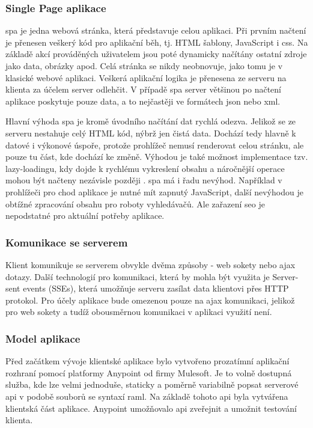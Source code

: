 \documentclass[a4paper,11pt,titlepage,fleqn]{article}
\begin{document}
        \subsubsection{Single Page aplikace}
            \gls{spa} je jedna webová stránka, která představuje celou aplikaci. Při prvním načtení je přenesen veškerý kód pro aplikační běh, tj. HTML šablony, JavaScript i \gls{css}. Na základě akcí prováděných uživatelem jsou poté dynamicky načítány ostatní zdroje jako data, obrázky apod. Celá stránka se nikdy neobnovuje, jako tomu je v klasické webové aplikaci. Veškerá aplikační logika je přenesena ze serveru na klienta za účelem server odlehčit. V případě \gls{spa} server většinou po načtení aplikace poskytuje pouze data, a to nejčastěji ve formátech \gls{json} nebo \gls{xml}.

            Hlavní výhoda \gls{spa} je kromě úvodního načítání dat rychlá odezva. Jelikož se ze serveru nestahuje celý HTML kód, nýbrž jen čistá data. Dochází tedy hlavně k datové i výkonové úspoře, protože prohlížeč nemusí renderovat celou stránku, ale pouze tu část, kde dochází ke změně. Výhodou je také možnost implementace tzv. lazy-loadingu, kdy dojde k rychlému vykreslení obsahu a náročnější operace mohou být načteny nezávisle později \cite{bib:spa}. \gls{spa} má i řadu nevýhod. Například v prohlížeči pro chod aplikace je nutné mít zapnutý JavaScript, další nevýhodou je obtížné zpracování obsahu pro roboty vyhledávačů. Ale zařazení \gls{seo} je nepodstatné pro aktuální potřeby aplikace.

        \subsubsection{Komunikace se serverem}
            Klient komunikuje se serverem obvykle dvěma způsoby - web sokety nebo \gls{ajax} dotazy. Další technologií pro komunikaci, která by mohla být využita je Server-sent events (SSEs), která umožňuje serveru zasílat data klientovi přes HTTP protokol. Pro účely aplikace bude omezenou pouze na \gls{ajax} komunikaci, jelikož pro web sokety a tudíž obousměrnou komunikaci v aplikaci využití není.

        \subsubsection{Model aplikace}
            Před začátkem vývoje klientské aplikace bylo vytvořeno prozatímní aplikační rozhraní pomocí platformy Anypoint od firmy Mulesoft. Je to volně dostupná služba, kde lze velmi jednoduše, staticky a poměrně variabilně popsat serverové \gls{api} v podobě souborů se syntaxí \gls{raml}. Na základě tohoto \gls{api} byla vytvářena klientská část aplikace. Anypoint umožňovalo \gls{api} zveřejnit a umožnit testování klienta. 
\end{document}
